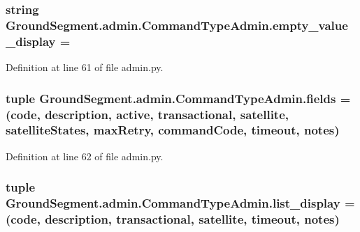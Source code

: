 \subsubsection[{empty\+\_\+value\+\_\+display}]{\setlength{\rightskip}{0pt plus 5cm}string Ground\+Segment.\+admin.\+Command\+Type\+Admin.\+empty\+\_\+value\+\_\+display = \textquotesingle{}\textquotesingle{}\hspace{0.3cm}{\ttfamily [static]}}\label{class_ground_segment_1_1admin_1_1_command_type_admin_a33d28f3ea0909e227e12b323b479cd4b}


Definition at line 61 of file admin.\+py.

\hypertarget{class_ground_segment_1_1admin_1_1_command_type_admin_a1ee0f5d0adfcd6a4daab57e600d1e6e0}{}
\subsubsection[{fields}]{\setlength{\rightskip}{0pt plus 5cm}tuple Ground\+Segment.\+admin.\+Command\+Type\+Admin.\+fields = (\textquotesingle{}code\textquotesingle{}, \textquotesingle{}description\textquotesingle{}, \textquotesingle{}active\textquotesingle{}, \textquotesingle{}transactional\textquotesingle{}, \textquotesingle{}satellite\textquotesingle{}, \textquotesingle{}satellite\+States\textquotesingle{}, \textquotesingle{}max\+Retry\textquotesingle{}, \textquotesingle{}command\+Code\textquotesingle{}, \textquotesingle{}timeout\textquotesingle{}, \textquotesingle{}notes\textquotesingle{})\hspace{0.3cm}{\ttfamily [static]}}\label{class_ground_segment_1_1admin_1_1_command_type_admin_a1ee0f5d0adfcd6a4daab57e600d1e6e0}


Definition at line 62 of file admin.\+py.

\hypertarget{class_ground_segment_1_1admin_1_1_command_type_admin_a5afd80db575f5f9696c042e09a22966d}{}
\subsubsection[{list\+\_\+display}]{\setlength{\rightskip}{0pt plus 5cm}tuple Ground\+Segment.\+admin.\+Command\+Type\+Admin.\+list\+\_\+display = (\textquotesingle{}code\textquotesingle{}, \textquotesingle{}description\textquotesingle{}, \textquotesingle{}transactional\textquotesingle{}, \textquotesingle{}satellite\textquotesingle{}, \textquotesingle{}timeout\textquotesingle{}, \textquotesingle{}notes\textquotesingle{})\hspace{0.3cm}{\ttfamily [static]}}\label{class_ground_segment_1_1admin_1_1_command_type_admin_a5afd80db575f5f9696c042e09a22966d}


